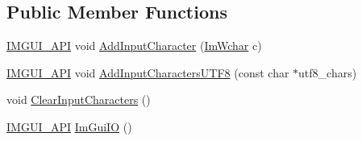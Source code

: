 \subsection*{Public Member Functions}
\begin{DoxyCompactItemize}
\item 
\mbox{\hyperlink{imgui_8h_a43829975e84e45d1149597467a14bbf5}{I\+M\+G\+U\+I\+\_\+\+A\+PI}} void \mbox{\hyperlink{struct_im_gui_i_o_a52b6bdef9278de5ae2031311a269cf14}{Add\+Input\+Character}} (\mbox{\hyperlink{imgui_8h_af2c7badaf05a0008e15ef76d40875e97}{Im\+Wchar}} c)
\item 
\mbox{\hyperlink{imgui_8h_a43829975e84e45d1149597467a14bbf5}{I\+M\+G\+U\+I\+\_\+\+A\+PI}} void \mbox{\hyperlink{struct_im_gui_i_o_adaf150a1908c02c3cae15a35915bbb26}{Add\+Input\+Characters\+U\+T\+F8}} (const char $\ast$utf8\+\_\+chars)
\item 
void \mbox{\hyperlink{struct_im_gui_i_o_a82d8794e14e628efbb026af4202c70ca}{Clear\+Input\+Characters}} ()
\item 
\mbox{\hyperlink{imgui_8h_a43829975e84e45d1149597467a14bbf5}{I\+M\+G\+U\+I\+\_\+\+A\+PI}} \mbox{\hyperlink{struct_im_gui_i_o_a0ad8d993e50108b81b0d279d2d43f69d}{Im\+Gui\+IO}} ()
\end{DoxyCompactItemize}

